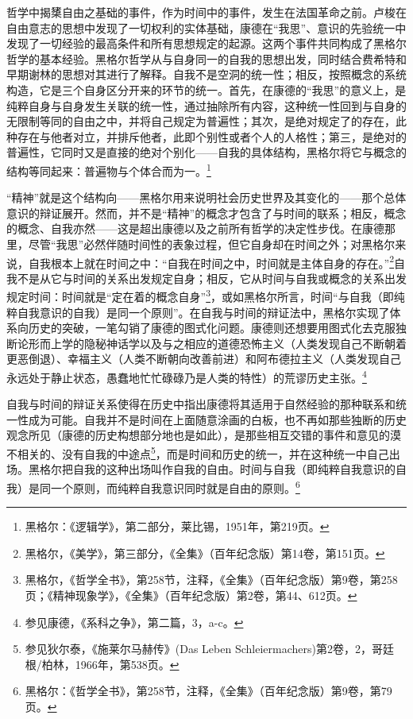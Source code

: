 哲学中揭橥自由之基础的事件，作为时间中的事件，发生在法国革命之前。卢梭在自由意志的思想中发现了一切权利的实体基础，康德在“我思”、意识的先验统一中发现了一切经验的最高条件和所有思想规定的起源。这两个事件共同构成了黑格尔哲学的基本经验。黑格尔哲学从与自身同一的自我的思想出发，同时结合费希特和早期谢林的思想对其进行了解释。自我不是空洞的统一性；相反，按照概念的系统构造，它是三个自身区分开来的环节的统一。首先，在康德的“我思”的意义上，是纯粹自身与自身发生关联的统一性，通过抽除所有内容，这种统一性回到与自身的无限制等同的自由之中，并将自己规定为普遍性；其次，是绝对规定了的存在，此种存在与他者对立，并排斥他者，此即个别性或者个人的人格性；第三，是绝对的普遍性，它同时又是直接的绝对个别化——自我的具体结构，黑格尔将它与概念的结构等同起来：普遍物与个体合而为一。\footnote{黑格尔：《逻辑学》，第二部分，莱比锡，1951年，第219页。}

“精神”就是这个结构向——黑格尔用来说明社会历史世界及其变化的——那个总体意识的辩证展开。然而，并不是“精神”的概念才包含了与时间的联系；相反，概念的概念、自我亦然——这是超出康德以及之前所有哲学的决定性步伐。在康德那里，尽管“我思”必然伴随时间性的表象过程，但它自身却在时间之外；对黑格尔来说，自我根本上就在时间之中：“自我在时间之中，时间就是主体自身的存在。”\footnote{黑格尔，《美学》，第三部分，《全集》（百年纪念版）第14卷，第151页。}自我不是从它与时间的关系出发规定自身；相反，它从时间与自我或概念的关系出发规定时间：时间就是“定在着的概念自身”\footnote{黑格尔，《哲学全书》，第258节，注释，《全集》（百年纪念版）第9卷，第258页；《精神现象学》，《全集》（百年纪念版）第2卷，第44、612页。}，或如黑格尔所言，时间“与自我（即纯粹自我意识的自我）是同一个原则”。在自我与时间的辩证法中，黑格尔实现了体系向历史的突破，一笔勾销了康德的图式化问题。康德则还想要用图式化去克服独断论形而上学的隐秘神话学以及与之相应的道德恐怖主义（人类发现自己不断朝着更恶倒退）、幸福主义（人类不断朝向改善前进）和阿布德拉主义（人类发现自己永远处于静止状态，愚蠢地忙忙碌碌乃是人类的特性）的荒谬历史主张。\footnote{参见康德，《系科之争》，第二篇，3，a-c。}

自我与时间的辩证关系使得在历史中指出康德将其适用于自然经验的那种联系和统一性成为可能。自我并不是时间在上面随意涂画的白板，也不再如那些独断的历史观念所见（康德的历史构想部分地也是如此），是那些相互交错的事件和意见的漠不相关的、没有自我的中途点\footnote{参见狄尔泰，《施莱尔马赫传》(Das Leben Schleiermachers)第2卷，2，哥廷根/柏林，1966年，第538页。}，而是时间和历史的统一，并在这种统一中自己出场。黑格尔把自我的这种出场叫作自我的自由。时间与自我（即纯粹自我意识的自我）是同一个原则，而纯粹自我意识同时就是自由的原则。\footnote{黑格尔：《哲学全书》，第258节，注释，《全集》（百年纪念版）第9卷，第79页。}


